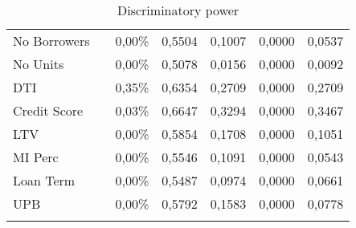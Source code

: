 {\begin{longtable}{ p{3cm} p{4cm} c c c c c}
No Borrowers                &                                                                   & 0,00\%  & 0,5504 & 0,1007 & 0,0000  & 0,0537 \\
No Units                    &                                                                   & 0,00\%  & 0,5078 & 0,0156 & 0,0000  & 0,0092 \\
DTI                         &                                                                   & 0,35\%  & 0,6354 & 0,2709 & 0,0000  & 0,2709 \\
Credit Score                &                                                                   & 0,03\%  & 0,6647 & 0,3294 & 0,0000  & 0,3467 \\
LTV                         &                                                                   & 0,00\%  & 0,5854 & 0,1708 & 0,0000  & 0,1051 \\
MI Perc                     &                                                                   & 0,00\%  & 0,5546 & 0,1091 & 0,0000  & 0,0543 \\
Loan Term                   &                                                                   & 0,00\%  & 0,5487 & 0,0974 & 0,0000  & 0,0661 \\
UPB                         &                                                                   & 0,00\%  & 0,5792 & 0,1583 & 0,0000  & 0,0778 \\\bottomrule
    
\caption{Discriminatory power}
\label{tab:re_discr_power}           
\end{longtable}
}

